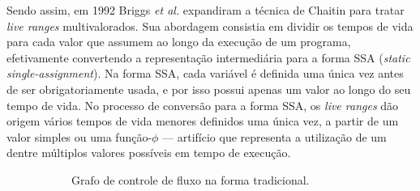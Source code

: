 \documentclass[
	12pt,				%
	openright,			%
	oneside,			%
	a4paper,			%
	tccpreliminar,			%
	]{ABNT-DC-UEL}
\begin{document}
Sendo assim, em 1992 Briggs \textit{et al.} expandiram a técnica de Chaitin para tratar \textit{live ranges} multivalorados. Sua abordagem consistia em dividir os tempos de vida para cada valor que assumem ao longo da execução de um programa, efetivamente convertendo a representação intermediária para a forma SSA (\textit{static single-assignment}). Na forma SSA, cada variável é definida uma única vez antes de ser obrigatoriamente usada, e por isso possui apenas um valor ao longo do seu tempo de vida. No processo de conversão para a forma SSA, os \textit{live ranges} dão origem vários tempos de vida menores definidos uma única vez, a partir de um valor simples ou uma função-$\phi$ --- artifício que representa a utilização de um dentre múltiplos valores possíveis em tempo de execução.

\begin{figure}[h]
    \centering
    \begin{subfigure}%
    {0.45\textwidth}
        \centering
        
        \caption{Grafo de controle de fluxo na forma tradicional.}
        \label{ssa-1}
    \end{subfigure}
    \begin{subfigure}%
    {0.45\textwidth}
        \centering
        

\end{subfigure}
\end{figure}
\end{document}
